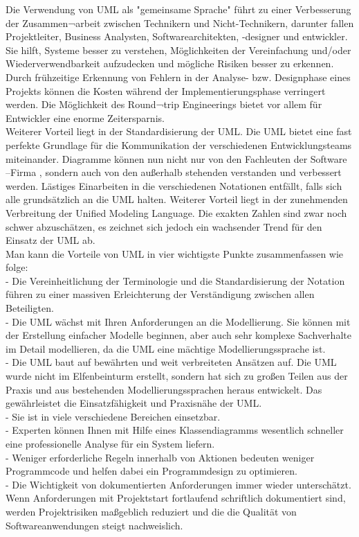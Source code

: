 Die Verwendung von UML als "gemeinsame Sprache" führt zu einer Verbesserung der Zusammen¬arbeit zwischen Technikern und Nicht-Technikern, darunter fallen Projektleiter, Business Analysten, Softwarearchitekten, -designer und  entwickler. Sie hilft, Systeme besser zu verstehen, Möglichkeiten der Vereinfachung und/oder Wiederverwendbarkeit aufzudecken und mögliche Risiken besser zu erkennen. Durch frühzeitige Erkennung von Fehlern in der Analyse- bzw. Designphase eines Projekts können die Kosten während der Implementierungsphase verringert werden. Die Möglichkeit des Round¬trip Engineerings bietet vor allem für Entwickler eine enorme Zeitersparnis.\\


Weiterer Vorteil liegt in der Standardisierung der UML. Die  UML bietet eine fast perfekte Grundlage für die Kommunikation der verschiedenen Entwicklungsteams miteinander. Diagramme können nun nicht nur von den Fachleuten der Software –Firma , sondern auch von den außerhalb stehenden verstanden und verbessert werden. Lästiges  Einarbeiten in die verschiedenen Notationen entfällt, falls sich alle grundsätzlich an die UML halten. 
Weiterer Vorteil liegt in der zunehmenden Verbreitung der Unified Modeling Language. Die exakten Zahlen sind zwar noch schwer abzuschätzen, es zeichnet sich jedoch ein wachsender Trend für den Einsatz der UML ab\cite{MT015}.\\
Man kann die Vorteile von UML in vier wichtigste Punkte zusammenfassen wie folge:\\

- Die Vereinheitlichung der Terminologie und die Standardisierung der Notation
führen zu einer massiven Erleichterung der Verständigung zwischen allen
Beteiligten\cite{MT016}.\\
- Die UML wächst mit Ihren Anforderungen an die Modellierung. Sie können mit der
Erstellung einfacher Modelle beginnen, aber auch sehr komplexe Sachverhalte im
Detail modellieren, da die UML eine mächtige Modellierungssprache ist\cite{MT016}.\\
- Die UML baut auf bewährten und weit verbreiteten Ansätzen auf. Die UML wurde
nicht im Elfenbeinturm erstellt, sondern hat sich zu großen Teilen aus der Praxis
und aus bestehenden Modellierungssprachen heraus entwickelt. Das gewährleistet
die Einsatzfähigkeit und Praxisnähe der UML.\\
- Sie ist in viele verschiedene Bereichen einsetzbar.\\
- Experten können Ihnen mit Hilfe eines Klassendiagramms wesentlich schneller eine professionelle Analyse für ein System liefern.\\
- Weniger erforderliche Regeln innerhalb von Aktionen bedeuten weniger Programmcode und helfen dabei ein Programmdesign zu optimieren.\\
- Die Wichtigkeit von dokumentierten Anforderungen immer wieder unterschätzt. Wenn Anforderungen mit Projektstart fortlaufend schriftlich dokumentiert sind, werden Projektrisiken maßgeblich reduziert und die die Qualität von Softwareanwendungen steigt nachweislich.

